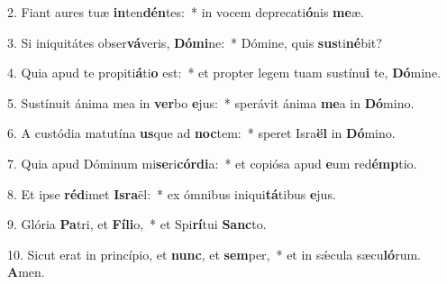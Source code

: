 2. Fiant aures tuæ \textbf{in}ten\textbf{dén}tes:~*  in vocem deprecati\textbf{ó}nis \textbf{me}æ.\

3. Si iniquitátes obser\textbf{vá}veris, \textbf{Dó}\textbf{mi}ne:~*  Dómine, quis \textbf{sus}ti\textbf{né}bit?\

4. Quia apud te propiti\textbf{á}ti\textbf{o} est:~*  et propter legem tuam sustínu\textbf{i} te, \textbf{Dó}mine.\

5. Sustínuit ánima mea in \textbf{ver}bo \textbf{e}jus:~*  sperávit ánima \textbf{me}a in \textbf{Dó}mino.\

6. A custódia matutína \textbf{us}que ad \textbf{noc}tem:~*  speret Isra\textbf{ël} in \textbf{Dó}mino.\

7. Quia apud Dóminum mi\textbf{se}ri\textbf{cór}\textbf{di}a:~*  et copiósa apud \textbf{e}um red\textbf{émp}tio.\

8. Et ipse \textbf{réd}imet \textbf{Is}\textbf{ra}ël:~*  ex ómnibus iniqui\textbf{tá}tibus \textbf{e}jus.\

9. Glória \textbf{Pa}tri, et \textbf{Fí}\textbf{li}o,~*  et Spi\textbf{rí}tui \textbf{Sanc}to.\

10. Sicut erat in princípio, et \textbf{nunc}, et \textbf{sem}per,~*  et in sǽcula sæcu\textbf{ló}rum. \textbf{A}men.\

